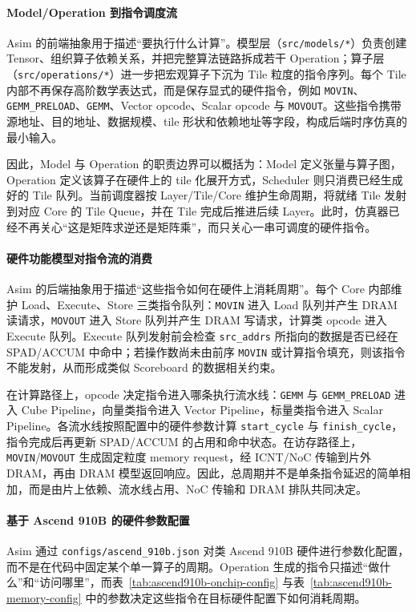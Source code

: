 \documentclass{CjC}
\begin{document}
    \paragraph{Model/Operation 到指令调度流}
    Asim 的前端抽象用于描述“要执行什么计算”。模型层（\texttt{src/models/*}）负责创建 Tensor、组织算子依赖关系，并把完整算法链路拆成若干
    Operation；算子层（\texttt{src/operations/*}）进一步把宏观算子下沉为 Tile
    粒度的指令序列。每个 Tile 内部不再保存高阶数学表达式，而是保存显式的硬件指令，例如
    \texttt{MOVIN}、\texttt{GEMM\_PRELOAD}、\texttt{GEMM}、Vector opcode、Scalar opcode
    与 \texttt{MOVOUT}。这些指令携带源地址、目的地址、数据规模、tile
    形状和依赖地址等字段，构成后端时序仿真的最小输入。

    因此，Model 与 Operation 的职责边界可以概括为：Model 定义张量与算子图，Operation
    定义该算子在硬件上的 tile 化展开方式，Scheduler 则只消费已经生成好的 Tile
    队列。当前调度器按 Layer/Tile/Core 维护生命周期，将就绪 Tile
    发射到对应 Core 的 Tile Queue，并在 Tile 完成后推进后续 Layer。此时，仿真器已经不再关心“这是矩阵求逆还是矩阵乘”，而只关心一串可调度的硬件指令。

    \paragraph{硬件功能模型对指令流的消费}
    Asim 的后端抽象用于描述“这些指令如何在硬件上消耗周期”。每个 Core 内部维护
    Load、Execute、Store 三类指令队列：\texttt{MOVIN} 进入 Load 队列并产生 DRAM
    读请求，\texttt{MOVOUT} 进入 Store 队列并产生 DRAM 写请求，计算类 opcode 进入 Execute
    队列。Execute 队列发射前会检查 \texttt{src\_addrs} 所指向的数据是否已经在 SPAD/ACCUM
    中命中；若操作数尚未由前序 \texttt{MOVIN} 或计算指令填充，则该指令不能发射，从而形成类似
    Scoreboard 的数据相关约束。

    在计算路径上，opcode 决定指令进入哪条执行流水线：\texttt{GEMM} 与
    \texttt{GEMM\_PRELOAD} 进入 Cube Pipeline，向量类指令进入 Vector Pipeline，标量类指令进入
    Scalar Pipeline。各流水线按照配置中的硬件参数计算 \texttt{start\_cycle} 与
    \texttt{finish\_cycle}，指令完成后再更新 SPAD/ACCUM 的占用和命中状态。在访存路径上，
    \texttt{MOVIN}/\texttt{MOVOUT} 生成固定粒度 memory request，经 ICNT/NoC
    传输到片外 DRAM，再由 DRAM 模型返回响应。因此，总周期并不是单条指令延迟的简单相加，而是由片上依赖、流水线占用、NoC
    传输和 DRAM 排队共同决定。

    \paragraph{基于 Ascend 910B 的硬件参数配置}
    Asim 通过 \texttt{configs/ascend\_910b.json} 对类 Ascend 910B
    硬件进行参数化配置，而不是在代码中固定某个单一算子的周期。Operation
    生成的指令只描述“做什么”和“访问哪里”，而表~\ref{tab:ascend910b-onchip-config}
    与表~\ref{tab:ascend910b-memory-config} 中的参数决定这些指令在目标硬件配置下如何消耗周期。
\end{document}

